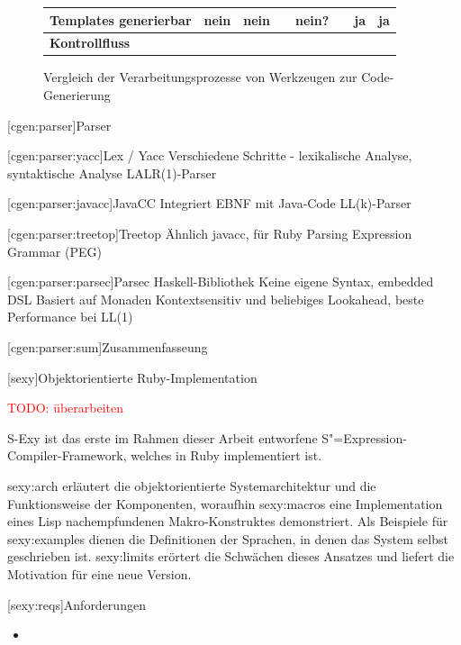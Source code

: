\documentclass[a4paper, bibgerm]{book}
\newcommand{\todo}[1]{
  \textcolor{red}{TODO: #1}
}
\newcommand\lchapter{}
\newcommand\lsection{}
\newcommand\lsubsection{}
\newcommand\sref{}
\newcommand{\sexy}{S-Exy}
\newcommand{\sexp}{S"=Expression}
\begin{document}
\begin{figure}
\begin{tabular}{|l|l|l|l|l|l|l|l|}
\bf Templates generierbar&nein           &nein                        &                           &nein?           &                &ja       &ja          \\\hline
\bf Kontrollfluss        &               &                            &                           &                &                &         &            \\\hline
\end{tabular}
\caption{Vergleich der Verarbeitungsprozesse von Werkzeugen zur Code-Generierung}
\label{magicl:tab:comp}
\end{figure}

\lsection[cgen:parser]{Parser}

\lsubsection[cgen:parser:yacc]{Lex / Yacc}
Verschiedene Schritte - lexikalische Analyse, syntaktische Analyse 
LALR(1)-Parser

\lsubsection[cgen:parser:javacc]{JavaCC}
 Integriert EBNF mit Java-Code
 LL(k)-Parser

\lsubsection[cgen:parser:treetop]{Treetop}
 Ähnlich javacc, für Ruby
 Parsing Expression Grammar (PEG)

\lsubsection[cgen:parser:parsec]{Parsec}
 Haskell-Bibliothek
 Keine eigene Syntax, embedded DSL
 Basiert auf Monaden
 Kontextsensitiv und beliebiges Lookahead, beste Performance bei LL(1)

\lsubsection[cgen:parser:sum]{Zusammenfasseung}

\lchapter[sexy]{Objektorientierte Ruby-Implementation}

\todo{überarbeiten}

\sexy{} ist das erste im Rahmen dieser Arbeit entworfene
\sexp{}-Compiler-Framework, welches in Ruby implementiert ist.

\sref{sexy:arch} erläutert die objektorientierte
Systemarchitektur und die Funktionsweise der Komponenten, woraufhin
\sref{sexy:macros} eine Implementation eines Lisp nachempfundenen
Makro-Konstruktes demonstriert. Als Beispiele für \sref{sexy:examples}
dienen die Definitionen der Sprachen, in denen das System selbst
geschrieben ist. \sref{sexy:limits} erörtert die Schwächen dieses
Ansatzes und liefert die Motivation für eine neue Version.

\lsection[sexy:reqs]{Anforderungen}

\begin{itemize}
\item 
\end{itemize}
\end{document}
